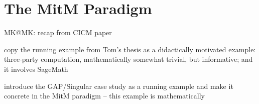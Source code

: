 \section{The MitM Paradigm}\label{sec:mitm}
\begin{todolist}{MK@MK: recap from CICM paper}
\item copy the running example from Tom's thesis as a didactically motivated example:
  three-party computation, mathematically somewhat trivial, but informative; and it
  involves SageMath
\item introduce the GAP/Singular case study as a running example and make it concrete in
  the MitM paradigm -- this example is mathematically
\end{todolist}

